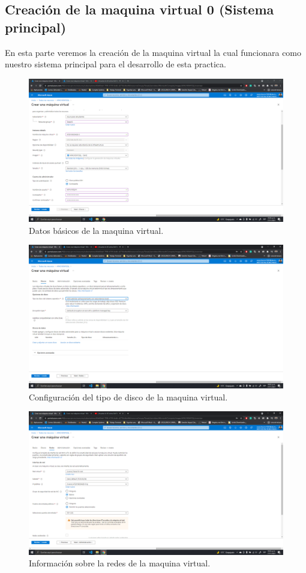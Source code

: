 \documentclass[11pt]{article}
\begin{document}
		\subsection{Creación de la maquina virtual 0 (Sistema principal)}
En esta parte veremos la creación de la maquina virtual la cual funcionara como nuestro sistema principal para el desarrollo de esta practica.
		\begin{figure}[H]
			\centering
			\includegraphics[scale=0.34]{resources/Infobasica0.png}
			\caption{Datos básicos de la maquina virtual.}\label{fig:picture}
		\end{figure}
		\begin{figure}[H]
			\centering
			\includegraphics[scale=0.34]{resources/disco0.png}
			\caption{Configuración del tipo de disco de la maquina virtual.}\label{fig:picture}
		\end{figure}
		\begin{figure}[H]
			\centering
			\includegraphics[scale=0.34]{resources/redes0.png}
			\caption{Información sobre la redes de la maquina virtual.}\label{fig:picture}
		\end{figure}
\end{document}
